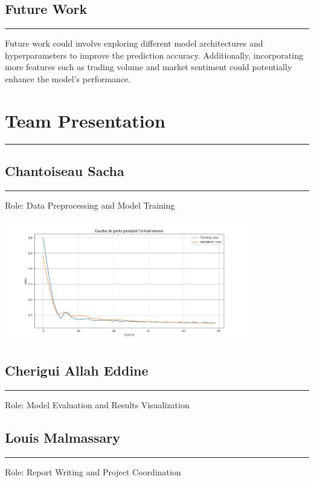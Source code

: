 \documentclass{article}
\begin{document}
\subsection{Future Work}
\noindent\rule{\textwidth}{1pt} %
Future work could involve exploring different model architectures and hyperparameters to improve the prediction accuracy. Additionally, incorporating more features such as trading volume and market sentiment could potentially enhance the model's performance.

\section{Team Presentation}
\noindent\rule{\textwidth}{1pt} %
\subsection{Chantoiseau Sacha}
\noindent\rule{\textwidth}{1pt} %
Role: Data Preprocessing and Model Training

\includegraphics[width=0.8\textwidth]{img/courbe_perte.png}
\subsection{Cherigui Allah Eddine}
\noindent\rule{\textwidth}{1pt} %
Role: Model Evaluation and Results Visualization

\subsection{Louis Malmassary}
\noindent\rule{\textwidth}{1pt} %
Role: Report Writing and Project Coordination
\end{document}
